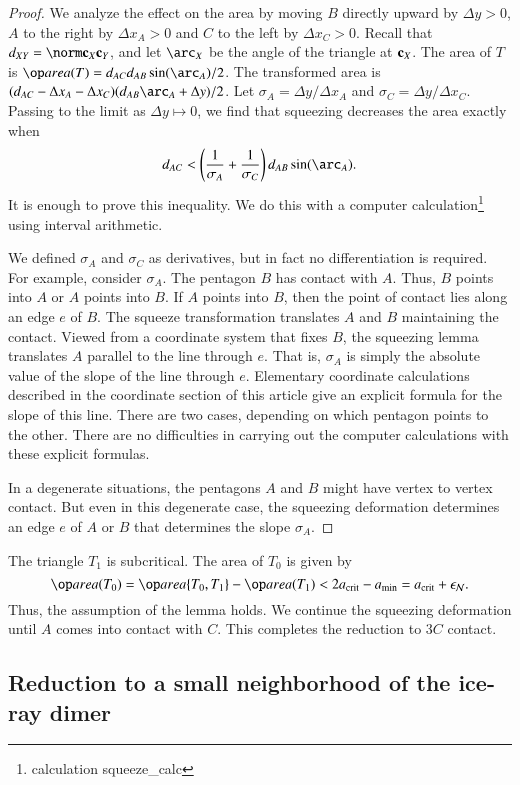 \begin{proof}  
  We analyze the effect on the area by moving $B$ directly upward by
  $\Delta y >0$, $A$ to the right by $\Delta x_A >0$ and $C$ to the
  left by $\Delta x_C >0$.  Recall that $\dx{XY} = \dd{X}{Y}$, and let
  $\arc_X$ be the angle of the triangle at ${\mathbf c}_X$.  The area of $T$ is
  $\area(T) = d_{AC} d_{AB} \sin(\arc_A)/2$.  The transformed area is
  $(d_{AC}-\Delta x_A - \Delta x_C)(d_{AB}\arc_A + \Delta y)/2$.
   Let $\sigma_A = \Delta y/\Delta x_A$ and $\sigma_C = \Delta y
  /\Delta x_C$.  Passing to the limit as $\Delta y \mapsto 0$, we find
  that squeezing decreases the area exactly when
\[
d_{AC} < \left(\frac{1}{\sigma_A}
+\frac{1}{\sigma_C}\right)d_{AB}\sin(\arc_A).
\]
It is enough to prove this inequality.  We do this with a computer
calculation\footnote{calculation squeeze\_calc} using interval
arithmetic.

We defined $\sigma_A$ and $\sigma_C$ as derivatives, but in fact no
differentiation is required.  For example, consider $\sigma_A$.  The
pentagon $B$ has contact with $A$.  Thus, $B$ points into $A$ or $A$
points into $B$.  If $A$ points into $B$, then the point of contact
lies along an edge $e$ of $B$.  The squeeze transformation translates
$A$ and $B$ maintaining the contact.  Viewed from a coordinate system
that fixes $B$, the squeezing lemma translates $A$ parallel to the
line through $e$.  That is, $\sigma_A$ is simply the absolute value of
the slope of the line through $e$.  Elementary coordinate calculations
described in the coordinate section of this article give an explicit
formula for the slope of this line.  There are two cases, depending on
which pentagon points to the other.  There are no difficulties in
carrying out the computer calculations with these explicit formulas.

In a degenerate situations, the pentagons $A$ and $B$ might have
vertex to vertex contact. But even in this degenerate case, the
squeezing deformation determines an edge $e$ of $A$ or $B$ that
determines the slope $\sigma_A$.
\end{proof}

The triangle $T_1$ is subcritical.  The area of $T_0$ is given by
\[
\area(T_0) = \area\{T_0,T_1\} - \area(T_1) 
< 2\acrit - \ao = \acrit+\epsN.
\]
Thus, the assumption of the lemma holds.  We continue the squeezing
deformation until $A$ comes into contact with $C$.  This completes the
reduction to $3C$ contact.


\subsection{Reduction to a small neighborhood of the ice-ray
  dimer}

